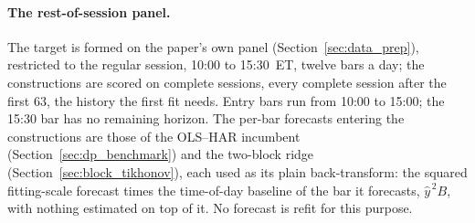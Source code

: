 \paragraph{The rest-of-session panel.} The target is formed on the paper's
own panel (Section~\ref{sec:data_prep}), restricted to the regular
session, 10:00 to 15:30~ET, twelve bars a day; the constructions are
scored on \mhNDays{} complete sessions, every complete session after the
first $63$, the history the first fit needs. Entry bars run from 10:00 to
15:00; the 15:30 bar has no remaining horizon. The per-bar forecasts
entering the constructions are those of the OLS--HAR incumbent
(Section~\ref{sec:dp_benchmark}) and the two-block ridge
(Section~\ref{sec:block_tikhonov}), each used as its plain
back-transform: the squared fitting-scale forecast times the
time-of-day baseline of the bar it forecasts, $\hat{y}^{\,2} B$, with
nothing estimated on top of it. No forecast is refit for this purpose.

